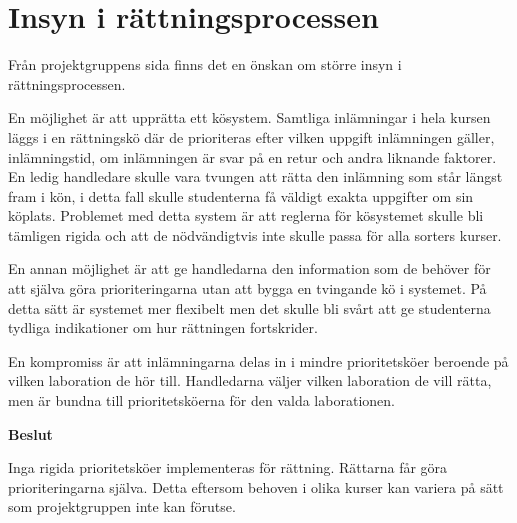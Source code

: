 \section{Insyn i rättningsprocessen}

Från projektgruppens sida finns det en önskan om större insyn i rättningsprocessen.

En möjlighet är att upprätta ett kösystem. Samtliga inlämningar i hela kursen läggs i en rättningskö där de prioriteras efter vilken uppgift inlämningen gäller, inlämningstid, om inlämningen är svar på en retur och andra liknande faktorer. En ledig handledare skulle vara tvungen att rätta den inlämning som står längst fram i kön, i detta fall skulle studenterna få väldigt exakta uppgifter om sin köplats. Problemet med detta system är att reglerna för kösystemet skulle bli tämligen rigida och att de nödvändigtvis inte skulle passa för alla sorters kurser.

En annan möjlighet är att ge handledarna den information som de behöver för att själva göra prioriteringarna utan att bygga en tvingande kö i systemet. På detta sätt är systemet mer flexibelt men det skulle bli svårt att ge studenterna tydliga indikationer om hur rättningen fortskrider.

En kompromiss är att inlämningarna delas in i mindre prioritetsköer beroende på vilken laboration de hör till. Handledarna väljer vilken laboration de vill rätta, men är bundna till prioritetsköerna för den valda laborationen. 

\begin{flushright}

  \textbf{Beslut}

  Inga rigida prioritetsköer implementeras för rättning. Rättarna får göra prioriteringarna själva. Detta eftersom behoven i olika kurser kan variera på sätt som projektgruppen inte kan förutse.
\end{flushright}
